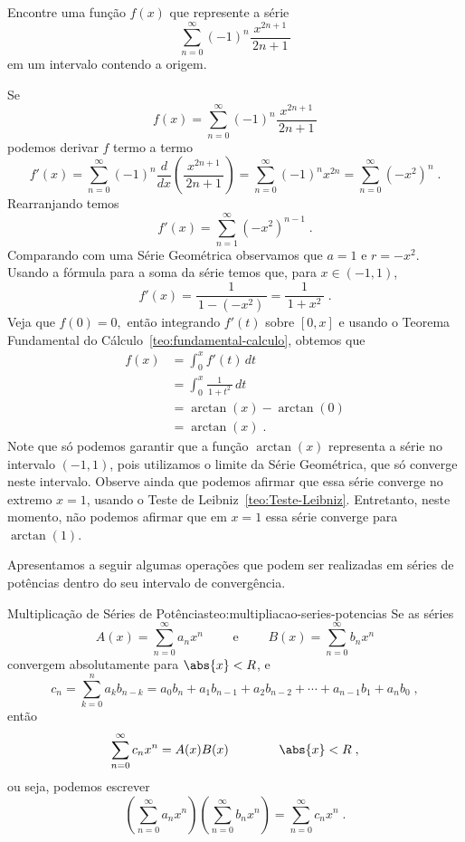 \begin{example}
  Encontre uma função $f(x)$ que represente a série
  \[
    \sum_{n=0}^\infty (-1)^n\frac{x^{2n+1}}{\,2n+1\,}
  \]
  em um intervalo contendo a origem.

  \solution
  Se
  \[
    f(x) = \sum_{n=0}^\infty (-1)^n\frac{x^{2n+1}}{\,2n+1\,}
  \]
  podemos derivar $f$ termo a termo
  \[
    f'(x) = \sum_{n=0}^\infty (-1)^n \frac{d}{dx}\left(\frac{x^{2n+1}}{\,2n+1\,}\right)
          = \sum_{n=0}^\infty (-1)^nx^{2n}
          = \sum_{n=0}^\infty \left(-x^2 \right)^n   \;.
  \]
  Rearranjando temos
  \[
    f'(x) = \sum_{n=1}^\infty \left(-x^2 \right)^{n-1}   \;.
  \]
  Comparando com uma Série Geométrica observamos que $a=1$ e $r=-x^2$.
  Usando a fórmula para a soma da série temos que,
  para $x\in (-1, 1)$,
  \[
    f'(x) = \frac{1}{\,1-\left(-x^2\right)\,}
          = \frac{1}{\,1+x^2\,}     \;.
  \]
  Veja que $f(0)=0, $ então integrando $f'(t)$ sobre $[0, x]$
  e usando o Teorema Fundamental do Cálculo~\ref{teo:fundamental-calculo},
  obtemos que
  \begin{align*}
    f(x) & = \int_0^x f'(t)\,dt               \\[3mm]
         & = \int_0^x \frac{1}{\,1+t^2\,}\,dt \\[3mm]
         & = \arctan(x) - \arctan(0)          \\[3mm]
         & = \arctan(x)     \;.
  \end{align*}
  Note que só podemos garantir que a função $\arctan(x)$ representa a
  série no intervalo $(-1, 1)$, pois utilizamos o limite da Série Geométrica,
  que só converge neste intervalo.
  Observe ainda que podemos afirmar que essa série converge no extremo $x=1$,
  usando o Teste de Leibniz~\ref{teo:Teste-Leibniz}.
  Entretanto, neste momento, não podemos afirmar que
  em $x=1$ essa série converge para $\arctan(1)$.
\end{example}

Apresentamos a seguir algumas operações que podem ser realizadas em séries de
potências dentro do seu intervalo de convergência.

\begin{teorema}{Multiplicação de Séries de Potências}{teo:multipliacao-series-potencias}
	Se as séries
	\[
		A(x) = \sum_{n=0}^{\infty} a_n x^n
    \qquad\text{ e }\qquad
  	B(x) = \sum_{n=0}^{\infty} b_n x^n
	\]
	convergem absolutamente para \(\abs{x}<R\), e
	\[
		c_n = \sum_{k=0}^{n} a_kb_{n-k}
         = a_0b_n + a_1b_{n-1} + a_2b_{n-2} + \cdots + a_{n-1}b_1 + a_nb_0     \;,
	\]
	então
  \[
    \sum_{n=0}^{\infty} c_nx^n = A(x)B(x)
    \qquad\qquad \abs{x}<R     \;,
  \]
	ou seja, podemos escrever
	\[
		\left(\sum_{n=0}^{\infty} a_n x^n\right)
		\left(\sum_{n=0}^{\infty} b_n x^n\right) =
		\sum_{n=0}^{\infty} c_nx^n     \;.
	\]
\end{teorema}

